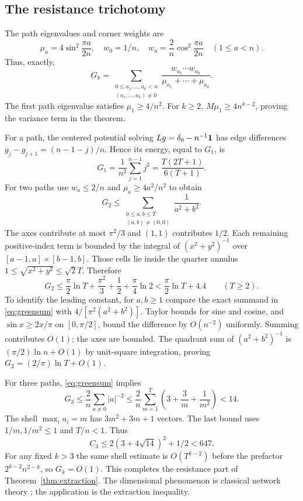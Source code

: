 \subsection{The resistance trichotomy}
The path eigenvalues and corner weights are
\[
 \mu_a=4\sin^2\frac{\pi a}{2n},\quad
 w_0=1/n,\quad w_a=\frac2n\cos^2\frac{\pi a}{2n}\quad(1\leq a<n).
\]
Thus, exactly,
\begin{equation}\label{eq:greensum}
 G_k=\sum_{\substack{0\leq a_1,\ldots,a_k<n\\(a_1,\ldots,a_k)\ne0}}
       \frac{w_{a_1}\cdots w_{a_k}}{\mu_{a_1}+\cdots+\mu_{a_k}}.
\end{equation}
The first path eigenvalue satisfies $\mu_1\geq4/n^2$. For $k\geq2$,
$M\mu_1\geq4n^{k-2}$, proving the variance term in the theorem.

For a path, the centered potential solving
$Lg=\delta_0-n^{-1}\mathbf 1$ has edge differences
$g_j-g_{j+1}=(n-1-j)/n$. Hence its energy, equal to $G_1$, is
\begin{equation}\label{eq:pathgreen}
 G_1=\frac1{n^2}\sum_{j=1}^{n-1}j^2
       =\frac{T(2T+1)}{6(T+1)}.
\end{equation}
For two paths use $w_a\leq2/n$ and
$\mu_a\geq4a^2/n^2$ to obtain
\[
 G_2\leq\sum_{\substack{0\leq a,b\leq T\\(a,b)\ne(0,0)}}\frac1{a^2+b^2}.
\]
The axes contribute at most $\pi^2/3$ and $(1,1)$ contributes $1/2$.
Each remaining positive-index term is bounded by the integral of
$(x^2+y^2)^{-1}$ over $[a-1,a]\times[b-1,b]$. Those cells lie inside
the quarter annulus $1\leq\sqrt{x^2+y^2}\leq\sqrt2T$. Therefore
\begin{equation}\label{eq:greenbound}
 G_2\leq\frac\pi2\ln T+\frac{\pi^2}3+\frac12+\frac\pi4\ln2
          <\frac\pi2\ln T+4.4\qquad(T\geq2).
\end{equation}
To identify the leading constant, for $a,b\geq1$ compare the exact
summand in \eqref{eq:greensum} with
$4/[\pi^2(a^2+b^2)]$. Taylor bounds for sine and cosine, and
$\sin x\geq2x/\pi$ on $[0,\pi/2]$, bound the difference by
$O(n^{-2})$ uniformly. Summing contributes $O(1)$; the axes are
bounded. The quadrant sum of $(a^2+b^2)^{-1}$ is
$(\pi/2)\ln n+O(1)$ by unit-square integration, proving
$G_2=(2/\pi)\ln T+O(1)$.

For three paths, \eqref{eq:greensum} implies
\[
 G_3\leq\frac2n\sum_{a\ne0}|a|^{-2}
 \leq\frac2n\sum_{m=1}^T\left(3+\frac3m+\frac1{m^2}\right)<14.
\]
The shell $\max_i a_i=m$ has $3m^2+3m+1$ vectors. The last bound
uses $1/m,1/m^2\leq1$ and $T/n<1$. Thus
\[
 C_3\leq2(3+4\sqrt{14})^2+1/2<647.
\]
For any fixed $k>3$ the same shell estimate is $O(T^{k-2})$ before
the prefactor $2^{k-2}n^{2-k}$, so $G_k=O(1)$.
This completes the resistance part of Theorem~\ref{thm:extraction}.
The dimensional phenomenon is classical network theory
\cite{cserti,doyle}; the application is the extraction inequality.

